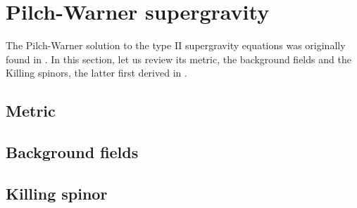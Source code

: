 \section{Pilch-Warner supergravity}\label{sec:PWB}
The Pilch-Warner solution to the type II supergravity equations was originally found in \cite{Pilch:2000ue}. 
In this section, let us review its metric, the background fields and the Killing spinors, the latter first derived in \cite{Pilch:2003jg}. 

\subsection{Metric}\label{sec:metric}


\subsection{Background fields}\label{sec:backgroundFields}


\subsection{Killing spinor}\label{sec:KillingSpinor}









